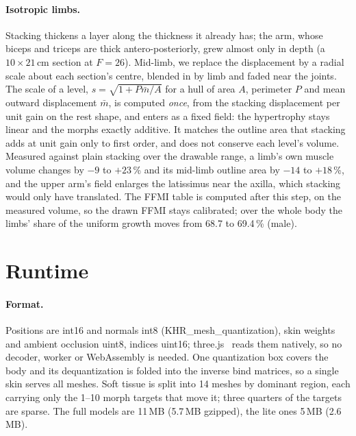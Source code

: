 \documentclass[10pt,twocolumn]{article}
\begin{document}
\paragraph{Isotropic limbs.}
Stacking thickens a layer along the thickness it already has; the arm, whose biceps and triceps are
thick antero-posteriorly, grew almost only in depth (a $10\times21$\,cm section at $F=26$). Mid-limb,
we replace the displacement by a radial scale about each section's centre, blended in by limb and
faded near the joints. The scale of a level, $s=\sqrt{1+P\bar m/A}$ for a hull of area $A$,
perimeter $P$ and mean outward displacement $\bar m$, is computed \emph{once}, from the stacking
displacement per unit gain on the rest shape, and enters as a fixed field: the hypertrophy stays
linear and the morphs exactly additive. It matches the outline area that stacking adds at unit gain
only to first order, and does not conserve each level's volume. Measured against plain stacking over
the drawable range, a limb's own muscle volume changes by $-9$ to $+23$\,\% and its mid-limb outline
area by $-14$ to $+18$\,\%, and the upper arm's field enlarges the latissimus near the axilla, which
stacking would only have translated. The FFMI table is computed after this step, on the measured
volume, so the drawn FFMI stays calibrated; over the whole body the limbs' share of the uniform
growth moves from 68.7 to 69.4\,\% (male).

\section{Runtime}\label{sec:runtime}

\paragraph{Format.}
Positions are int16 and normals int8 (KHR\_mesh\_quantization), skin weights and ambient occlusion
uint8, indices uint16; three.js~\cite{threejs} reads them natively, so no decoder, worker or
WebAssembly is needed. One quantization box covers the body and its dequantization is folded into
the inverse bind matrices, so a single skin serves all meshes. Soft tissue is split into 14 meshes
by dominant region, each carrying only the 1--10 morph targets that move it; three quarters of the
targets are sparse. The full models are 11\,MB (5.7\,MB gzipped), the lite ones 5\,MB (2.6\,MB).
\end{document}
